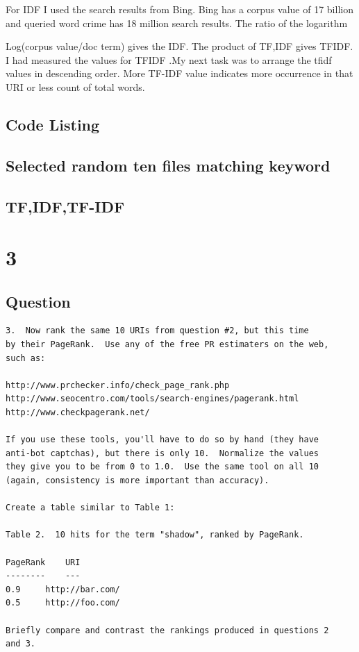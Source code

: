 \documentclass[letterpaper,11pt]{article}
\begin{document}
For IDF I used the search results from Bing. Bing has a corpus value of 17 billion and queried word crime has 18 million search results. The ratio of the logarithm 

Log(corpus value/doc term) gives the IDF. The product of TF,IDF gives TFIDF.
I had measured the values for TFIDF .My next task was to arrange the tfidf values in descending order.
More TF-IDF value indicates more occurrence in that URI or less count of total words.


\subsection*{Code Listing} 

\newpage
\subsection*{Selected random ten files matching keyword} 

\subsection*{TF,IDF,TF-IDF} 

\newpage

\section*{3}

\subsection*{Question}

\begin{verbatim}
3.  Now rank the same 10 URIs from question #2, but this time 
by their PageRank.  Use any of the free PR estimaters on the web,
such as:

http://www.prchecker.info/check_page_rank.php
http://www.seocentro.com/tools/search-engines/pagerank.html
http://www.checkpagerank.net/

If you use these tools, you'll have to do so by hand (they have
anti-bot captchas), but there is only 10.  Normalize the values
they give you to be from 0 to 1.0.  Use the same tool on all 10
(again, consistency is more important than accuracy).

Create a table similar to Table 1:

Table 2.  10 hits for the term "shadow", ranked by PageRank.

PageRank	URI
--------	---
0.9		http://bar.com/
0.5		http://foo.com/

Briefly compare and contrast the rankings produced in questions 2
and 3.



\end{verbatim}
\end{document}
